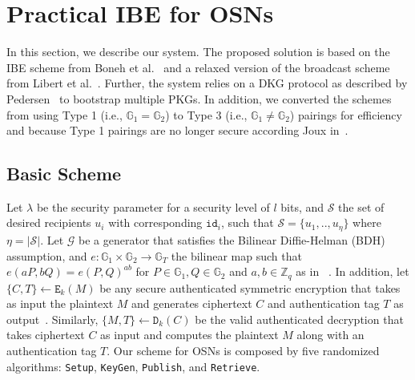 \documentclass[journal]{IEEEtran}
\newcommand{\id}[1]{\ensuremath{\mathtt{id}_{#1}}}
\begin{document}
\section{Practical IBE for OSNs}\label{sec:solution}

In this section, we describe our system. The proposed solution is based on the IBE scheme from Boneh et al.~\cite{BonehFranklinIBE} and a relaxed version of the broadcast scheme from Libert et al.~\cite{LibertANOBE}. Further, the system relies on a DKG protocol as described by Pedersen~\cite{Pedersen:1991:NIS:646756.705507} to bootstrap multiple PKGs. In addition, we converted the schemes from using Type 1 (i.e., $\mathbb{G}_1 = \mathbb{G}_2$) to Type 3 (i.e., $\mathbb{G}_1 \neq \mathbb{G}_2$) pairings for efficiency~\cite{Galbraith:2008:PC:1450345.1450543} and because Type 1 pairings are no longer secure according Joux in~\cite{DBLP:journals/iacr/Joux13}.


\subsection{Basic Scheme}

Let $\lambda$ be the security parameter for a security level of $l$ bits, and $\mathcal{S}$ the set of desired recipients $u_i$ with corresponding \id{i}, such that $\mathcal{S} = \{u_1,..,u_\eta\}$ where $\eta=|\mathcal{S}|$. Let $\mathcal{G}$ be a generator that satisfies the Bilinear Diffie-Helman (BDH) assumption, and $e: \mathbb{G}_1 \times \mathbb{G}_2 \rightarrow \mathbb{G}_T$ the bilinear map such that $e \left( aP, bQ \right) = e \left( P, Q \right)^{ab}$ for $P \in \mathbb{G}_1, Q\in \mathbb{G}_2$ and $a,b \in \mathbb{Z}_q$ as in~\cite{BonehFranklinIBE} .
In addition, let $\{ C, T\} \leftarrow \mathtt{E}_k(M)$ be any secure authenticated symmetric encryption that takes as input the plaintext $M$ and generates ciphertext $C$ and authentication tag $T$ as output~\cite{rfc5288}. Similarly, $\{ M, T \} \leftarrow \mathtt{D}_k(C)$ be the valid authenticated decryption that takes ciphertext $C$ as input and computes the plaintext $M$ along with an authentication tag $T$. 
Our scheme for OSNs is composed by five randomized algorithms: \texttt{Setup}, \texttt{KeyGen}, \texttt{Publish}, and \texttt{Retrieve}.

\medskip
\end{document}
